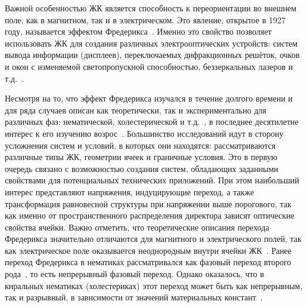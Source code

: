 Важной особенностью ЖК является способность к переориентации во внешнем поле, как в магнитном, так и в электрическом.
Это явление, открытое в 1927 году, называется эффектом Фредерикса~\autocite{Fred1927,Fred1933}.
Именно это свойство позволяет использовать ЖК для создания различных электрооптических устройств: систем вывода информации (дисплеев), переключаемых дифракционных решёток, очков и окон с изменяемой светопропускной способностью, беззеркальных лазеров и т.д.~\cite{Blinov1994, McManamon1996, Taheri2000, F.2001, Schmidtke2003, Senyuk2005, Jiang2019}.

Несмотря на то, что эффект Фредерикса изучался в течение долгого времени и для ряда случаев описан как теоретически, так и экспериментально для различных фаз: нематической, холестерической и т.д.~\cite{pikin, deGennesbook1995, stewartBook}, в последнее десятилетие интерес к его изучению возрос~\cite{Brown2003, Brown2007, Makarov2010, Garbovskiy2017, dosSantos2019, Begum2020}.
Большинство исследований идут в сторону усложнения систем и условий, в которых они находятся: рассматриваются различные типы ЖК, геометрии ячеек и граничные условия.
Это в первую очередь связано с возможностью создания систем, обладающих заданными свойствами для потенциальных технических приложений.
При этом наибольший интерес представляют напряжения, индуцирующие переход, а также трансформация равновесной структуры при напряжении выше порогового, так как именно от пространственного распределения директора зависят оптические свойства ячейки.
Важно отметить, что теоретические описания перехода Фредерикса значительно отличаются для магнитного и электрического полей, так как электрическое поле оказывается неоднородным внутри ячейки ЖК~\autocite{Deuling,NonHomoElectricField1972,CTBerr,Arakelyan1984,Napoli2006}.
Ранее переход Фредерикса в нематиках рассматривался как фазовый переход второго рода~\autocite{Guyon1975}, то есть непрерывный фазовый переход.
Однако оказалось, что в киральных нематиках (холестериках) этот переход может быть как непрерывным, так и разрывный, в зависимости от значений материальных констант~\autocite{VAR2013}.

